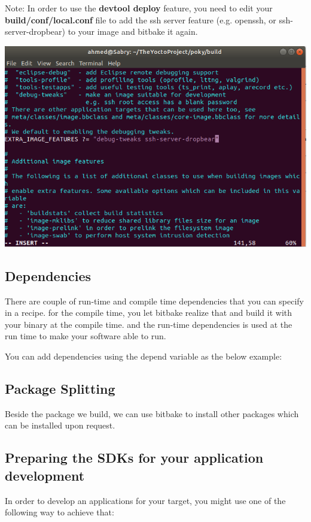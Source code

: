 \documentclass{article}
\begin{document}
\begin{enumerate}
  Note:
  In order to use the \textbf{devtool deploy} feature, you need to edit your \textbf{build/conf/local.conf} file to add the ssh server feature (e.g. openssh, or ssh-server-dropbear) to your image and bitbake it again.

  \begin{center}
    \includegraphics[scale=0.6]{./resources/img/image_features-add-ssh-dropbear.png}
  \end{center}
\end{enumerate}
  

\subsection{Dependencies}
There are couple of run-time and compile time dependencies that you can specify in a recipe. for the compile time, you let bitbake realize that and build it with your binary at the compile time. and the run-time dependencies is used at the run time to make your software able to run.

You can add dependencies using the depend variable as the below example:

\subsection{Package Splitting}
Beside the package we build, we can use bitbake to install other packages which can be installed upon request.

\subsection{Preparing the SDKs for your application development}
In order to develop an applications for your target, you might use one of the following way to achieve that:
\end{document}
